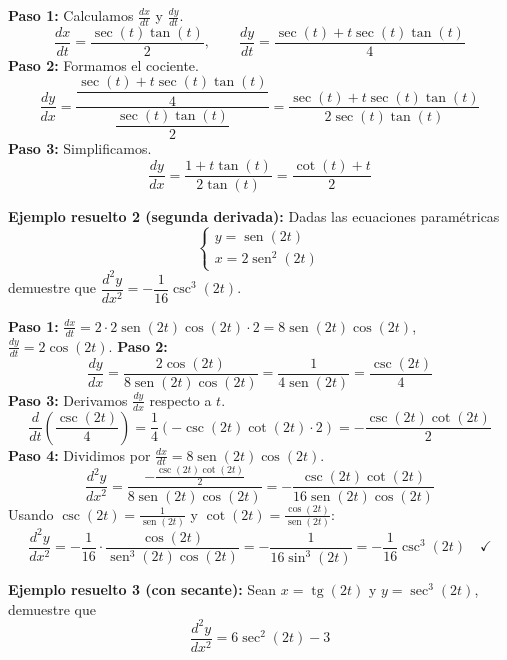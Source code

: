 \documentclass[12pt, letterpaper]{article}
\begin{document}
\begin{cuadrosolucion}
  \textbf{Paso 1:} Calculamos $\frac{dx}{dt}$ y $\frac{dy}{dt}$.
  \[
    \frac{dx}{dt} = \frac{\sec(t)\tan(t)}{2}, \qquad
    \frac{dy}{dt} = \frac{\sec(t) + t\sec(t)\tan(t)}{4}
  \]
  \textbf{Paso 2:} Formamos el cociente.
  \[
    \frac{dy}{dx} = \frac{\dfrac{\sec(t) + t\sec(t)\tan(t)}{4}}{\dfrac{\sec(t)\tan(t)}{2}}
    = \frac{\sec(t) + t\sec(t)\tan(t)}{2\sec(t)\tan(t)}
  \]
  \textbf{Paso 3:} Simplificamos.
  \[
    \frac{dy}{dx} = \frac{1 + t\tan(t)}{2\tan(t)} = \frac{\cot(t) + t}{2}
  \]
\end{cuadrosolucion}

\noindent\textbf{Ejemplo resuelto 2 (segunda derivada):} Dadas las ecuaciones paramétricas
\[
  \begin{cases} y = \operatorname{sen}(2t) \\ x = 2\operatorname{sen}^2(2t) \end{cases}
\]
demuestre que $\dfrac{d^2y}{dx^2} = -\dfrac{1}{16}\csc^3(2t)$.

\begin{cuadrosolucion}
  \textbf{Paso 1:} $\frac{dx}{dt} = 2\cdot 2\operatorname{sen}(2t)\cos(2t)\cdot 2 = 8\operatorname{sen}(2t)\cos(2t)$, \quad $\frac{dy}{dt} = 2\cos(2t)$.
  \textbf{Paso 2:}
  \[
    \frac{dy}{dx} = \frac{2\cos(2t)}{8\operatorname{sen}(2t)\cos(2t)} = \frac{1}{4\operatorname{sen}(2t)} = \frac{\csc(2t)}{4}
  \]
  \textbf{Paso 3:} Derivamos $\frac{dy}{dx}$ respecto a $t$.
  \[
    \frac{d}{dt}\left(\frac{\csc(2t)}{4}\right) = \frac{1}{4}\left(-\csc(2t)\cot(2t)\cdot 2\right) = -\frac{\csc(2t)\cot(2t)}{2}
  \]
  \textbf{Paso 4:} Dividimos por $\frac{dx}{dt} = 8\operatorname{sen}(2t)\cos(2t)$.
  \[
    \frac{d^2y}{dx^2} = \frac{-\frac{\csc(2t)\cot(2t)}{2}}{8\operatorname{sen}(2t)\cos(2t)} = -\frac{\csc(2t)\cot(2t)}{16\operatorname{sen}(2t)\cos(2t)}
  \]
  Usando $\csc(2t) = \frac{1}{\operatorname{sen}(2t)}$ y $\cot(2t) = \frac{\cos(2t)}{\operatorname{sen}(2t)}$:
  \[
    \frac{d^2y}{dx^2} = -\frac{1}{16}\cdot\frac{\cos(2t)}{\operatorname{sen}^3(2t)\cos(2t)}
      = -\frac{1}{16\sin^3(2t)}
    = -\frac{1}{16}\csc^3(2t) \quad \checkmark
  \]
\end{cuadrosolucion}

\noindent\textbf{Ejemplo resuelto 3 (con secante):} Sean $x = \operatorname{tg}(2t)$ y $y = \sec^3(2t)$, demuestre que
\[
  \frac{d^2y}{dx^2} = 6\sec^2(2t) - 3
\]
\end{document}
